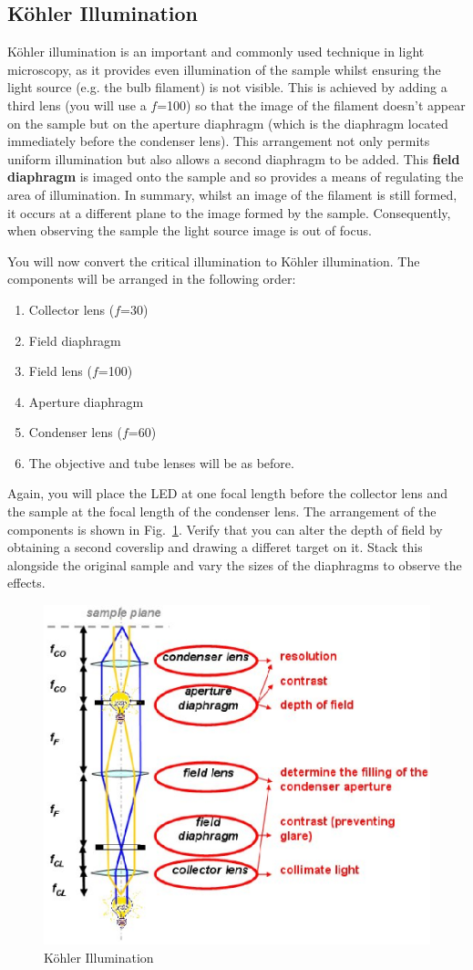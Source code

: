 \documentclass[a4paper]{report}
\begin{document}
\subsection{K\"{o}hler Illumination}
K\"{o}hler illumination is an important and commonly used technique in
light microscopy, as it provides even illumination of the sample
whilst ensuring the light source (e.g. the bulb filament) is not
visible. This is achieved by adding a third lens (you will use a
$f$=100) so that the image of the filament doesn't appear on the
sample but on the aperture diaphragm (which is the diaphragm located
immediately before the condenser lens). This arrangement not only
permits uniform illumination but also allows a second diaphragm to be
added. This \textbf{field diaphragm} is imaged onto the sample and so
provides a means of regulating the area of illumination. In summary,
whilst an image of the filament is still formed, it occurs at a
different plane to the image formed by the sample. Consequently, when
observing the sample the light source image is out of focus.

You will now convert the critical illumination to K\"{o}hler
illumination.  The components will be arranged in the following order:
\begin{enumerate}
\item Collector lens ($f$=30)
\item Field diaphragm
\item Field lens ($f$=100)
\item Aperture diaphragm
\item Condenser lens ($f$=60)
\item The objective and tube lenses will be as before. 
\end{enumerate}

Again, you will place the LED at one focal length before the collector
lens and the sample at the focal length of the condenser lens. The
arrangement of the components is shown in Fig.~\ref{koehler}. Verify
that you can alter the depth of field by obtaining a second coverslip
and drawing a differet target on it. Stack this alongside the original
sample and vary the sizes of the diaphragms to observe the effects. 


\begin{figure}[h]
\center
\includegraphics[width=5in]{koehler.eps}
\caption{K\"{o}hler Illumination}
\label{koehler}
\end{figure}
\end{document}
